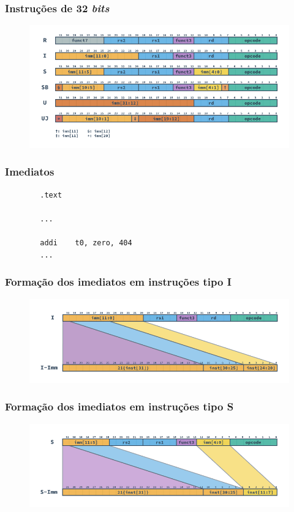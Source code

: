 \documentclass{beamer}
\begin{document}
    \begin{frame}
        \frametitle{Instruções de 32 \textit{bits}}
        \begin{figure}[H]
        \centering
            \includegraphics[width=.9\textwidth,height=.9\textheight,keepaspectratio]{../images/RV_Formats.png}
        \end{figure}
    \end{frame}

    \begin{frame}[fragile]
        \frametitle{Imediatos}
        \begin{lstlisting}
        .text

        ...

        addi    t0, zero, 404
        ...
        \end{lstlisting}
    \end{frame}

    \begin{frame}
        \frametitle{Formação dos imediatos em instruções tipo \textbf{I}}
        \begin{figure}[H]
        \centering
            \includegraphics[width=.9\textwidth,height=.9\textheight,keepaspectratio]{../images/RV_I_Imm.png}
        \end{figure}
    \end{frame}

    \begin{frame}
        \frametitle{Formação dos imediatos em instruções tipo \textbf{S}}
        \begin{figure}[H]
        \centering
            \includegraphics[width=.9\textwidth,height=.9\textheight,keepaspectratio]{../images/RV_S_Imm.png}
        \end{figure}
    \end{frame}
\end{document}
